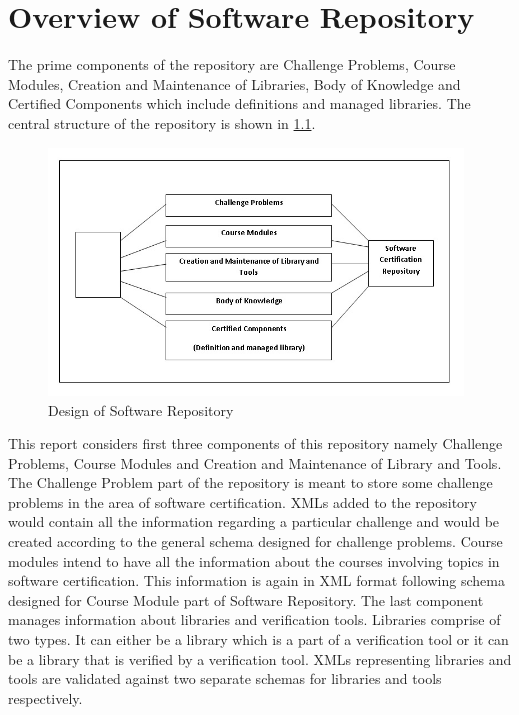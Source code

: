 \documentclass[11pt,letterpaper]{report}
\begin{document}
\chapter{Overview of Software Repository}
The prime components of the repository are Challenge Problems, Course Modules, Creation and Maintenance of Libraries, Body of Knowledge and Certified Components which include definitions and managed libraries. The central structure of the repository is shown in \ref{Fig:1}.
\begin{figure}[ht]
\centering
\includegraphics[width=110mm]{Images/Overview_SW_Repo.jpg}
\caption{Design of Software Repository}
\label{Fig:1}
\end{figure}

This report considers first three components of this repository namely Challenge Problems, Course Modules and Creation and Maintenance of Library and Tools. The Challenge Problem part of the repository is meant to store some challenge problems in the area of software certification. XMLs added to the repository would contain all the information regarding a particular challenge and would be created according to the general schema designed for challenge problems. Course modules intend to have all the information about the courses involving topics in software certification. This information is again in XML format following schema designed for Course Module part of Software Repository. The last component manages information about libraries and verification tools. Libraries comprise of two types. It can either be a library which is a part of a verification tool or it can be a library that is verified by a verification tool. XMLs representing libraries and tools are validated against two separate schemas for libraries and tools respectively. 
\end{document}
